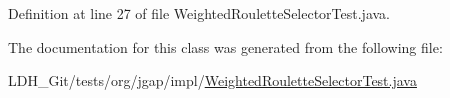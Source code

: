 Definition at line 27 of file Weighted\-Roulette\-Selector\-Test.\-java.



The documentation for this class was generated from the following file\-:\begin{DoxyCompactItemize}
\item 
L\-D\-H\-\_\-\-Git/tests/org/jgap/impl/\hyperlink{_weighted_roulette_selector_test_8java}{Weighted\-Roulette\-Selector\-Test.\-java}\end{DoxyCompactItemize}
